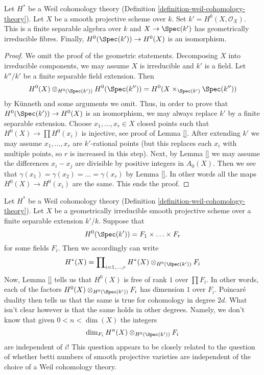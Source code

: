 \begin{lemma}
\label{lemma-H-0}
Let $H^*$ be a Weil cohomology theory
(Definition \ref{definition-weil-cohomology-theory}).
Let $X$ be a smooth projective scheme over $k$. Set
$k' = H^0(X, \mathcal{O}_X)$. This is a finite separable algebra
over $k$ and $X \to \Spec(k')$ has geometrically irreducible
fibres. Finally, $H^0(\Spec(k')) \to H^0(X)$ is an isomorphism.
\end{lemma}

\begin{proof}
We omit the proof of the geometric statements. Decomposing
$X$ into irreducible components, we may assume $X$ is irreducible
and $k'$ is a field. Let $k''/k'$ be a finite separable field
extension. Then
$$
H^0(X) \otimes_{H^0(\Spec(k'))} H^0(\Spec(k'')) =
H^0(X \times_{\Spec(k')} \Spec(k''))
$$
by K\"unneth and some arguments we omit. Thus, in order to prove that
$H^0(\Spec(k')) \to H^0(X)$ is an isomorphism, we may always replace
$k'$ by a finite separable extension.
Choose $x_1, \ldots, x_r \in X$ closed
points such that $H^0(X) \to \prod H^0(x_i)$ is injective, see
proof of Lemma \ref{}.
After extending $k'$ we may assume $x_1, \ldots, x_r$
are $k'$-rational points (but this replaces each $x_i$ with multiple
points, so $r$ is increased in this step). Next, by Lemma \ref{}
we may assume the differences $x_i - x_j$ are divisible by
positive integers in $A_0(X)$. Then we see that
$\gamma(x_1) = \gamma(x_2) = \ldots = \gamma(x_r)$ by Lemma \ref{}.
In other words all the maps $H^0(X) \to H^0(x_i)$
are the same. This ends the proof.
\end{proof}

\begin{remark}
\label{remark-betti-numbers-in-some-sense}
Let $H^*$ be a Weil cohomology theory
(Definition \ref{definition-weil-cohomology-theory}).
Let $X$ be a geometrically irreducible smooth projective scheme
over a finite separable extension $k'/k$. Suppose that
$$
H^0(\Spec(k')) = F_1 \times \ldots \times F_r
$$
for some fields $F_i$. Then we accordingly can write
$$
H^*(X) = \prod\nolimits_{i = 1, \ldots, r}
H^*(X) \otimes_{H^0(\Spec(k'))} F_i
$$
Now, Lemma \ref{} tells us that $H^0(X)$ is free of rank $1$
over $\prod F_i$. In other words, each of the factors
$H^0(X) \otimes_{H^0(\Spec(k'))} F_i$ has dimension $1$ over $F_i$.
Poincar\'e duality then tells us that the same is true for
cohomology in degree $2d$.
What isn't clear however is that the same holds in other degrees.
Namely, we don't know that given $0 < n < \dim(X)$ the integers
$$
\dim_{F_i} H^n(X) \otimes_{H^0(\Spec(k'))} F_i
$$
are independent of $i$! This question appears to be closely related
to the question of whether betti numbers of smooth projective
varieties are independent of the choice of a Weil cohomology theory.
\end{remark}














